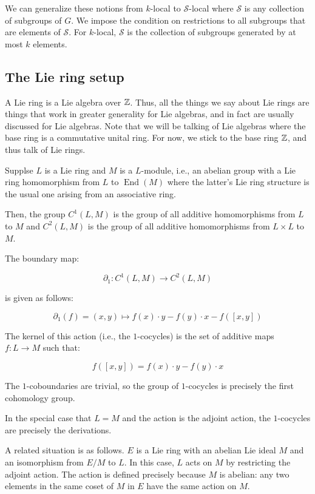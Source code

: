 \documentclass[10pt]{amsart}
\begin{document}
We can generalize these notions from $k$-local to $\mathcal{S}$-local
where $\mathcal{S}$ is any collection of subgroups of $G$. We impose
the condition on restrictions to all subgroups that are elements of
$\mathcal{S}$. For $k$-local, $\mathcal{S}$ is the collection of
subgroups generated by at most $k$ elements.

\subsection{The Lie ring setup}

A Lie ring is a Lie algebra over $\mathbb{Z}$. Thus, all the things we say
about Lie rings are things that work in greater generality for Lie
algebras, and in fact are usually discussed for Lie algebras. Note
that we will be talking of Lie algebras where the base ring is a
commutative unital ring. For now, we stick to the base ring $\mathbb{Z}$, and
thus talk of Lie rings.

Supplse $L$ is a Lie ring and $M$ is a $L$-module, i.e., an abelian
group with a Lie ring homomorphism from $L$ to $\operatorname{End}(M)$
where the latter's Lie ring structure is the usual one arising from an
associative ring.

Then, the group $C^1(L,M)$ is the group of all additive
homomorphisms from $L$ to $M$ and $C^2(L,M)$ is the group of all
additive homomorphisms from $L \times L$ to $M$.

The boundary map:

$$\partial_1: C^1(L,M) \to C^2(L,M)$$

is given as follows:

$$\partial_1(f) = (x,y) \mapsto f(x) \cdot y - f(y) \cdot x - f([x,y])$$

The kernel of this action (i.e., the $1$-cocycles) is the set of
additive maps $f:L \to M$ such that:

$$f([x,y]) = f(x) \cdot y - f(y) \cdot x$$

The $1$-coboundaries are trivial, so the group of $1$-cocycles is
precisely the first cohomology group.

In the special case that $L = M$ and the action is the adjoint action,
the $1$-cocycles are precisely the derivations.

A related situation is as follows. $E$ is a Lie ring with an abelian
Lie ideal $M$ and an isomorphism from $E/M$ to $L$. In this case, $L$
acts on $M$ by restricting the adjoint action. The action is defined
precisely because $M$ is abelian: any two elements in the same coset
of $M$ in $E$ have the same action on $M$.
\end{document}
